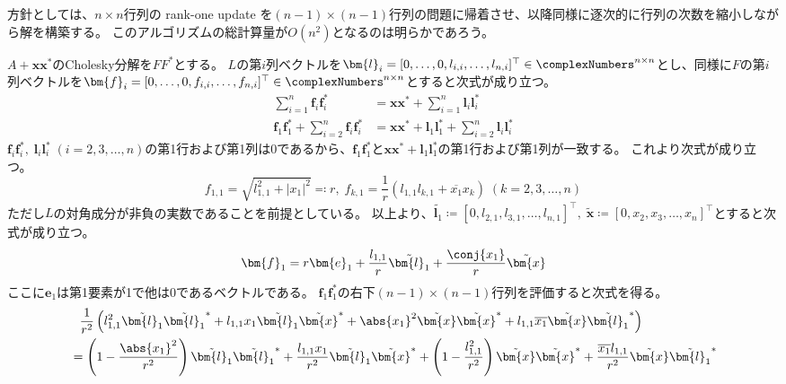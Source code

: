         \begin{derivation*}
            方針としては、$n\times n$行列の rank-one update を$(n-1)\times(n-1)$行列の問題に帰着させ、以降同様に逐次的に行列の次数を縮小しながら解を構築する。
            このアルゴリズムの総計算量が$O(n^2)$となるのは明らかであろう。
            \par
            $A+\bm{x}\bm{x}^*$のCholesky分解を$FF^*$とする。
            $L$の第$i$列ベクトルを$\bm{l}_i = [0,\dots,0,l_{i,i},\dots,l_{n,i}]^\top\in\complexNumbers^{n\times n}$とし、同様に$F$の第$i$列ベクトルを$\bm{f}_i = [0,\dots,0,f_{i,i},\dots,f_{n,i}]^\top\in\complexNumbers^{n\times n}$とすると次式が成り立つ。
            \begin{align*}
                \sum_{i=1}^n \bm{f}_i\bm{f}_i^* &= \bm{x}\bm{x}^* + \sum_{i=1}^n \bm{l}_i\bm{l}_i^* \\
                \bm{f}_1\bm{f}_1^* + \sum_{i=2}^n \bm{f}_i\bm{f}_i^* &= \bm{x}\bm{x}^* + \bm{l}_1\bm{l}_1^* + \sum_{i=2}^n \bm{l}_i\bm{l}_i^* \tag{1}
            \end{align*}
            $\bm{f}_i\bm{f}_i^*,\;\bm{l}_i\bm{l}_i^*\;(i=2,3,\dots,n)$の第1行および第1列は0であるから、$\bm{f}_1\bm{f}_1^*$と$\bm{x}\bm{x}^* + \bm{l}_1\bm{l}_1^*$の第1行および第1列が一致する。
            これより次式が成り立つ。
            \[ f_{1,1} = \sqrt{l_{1,1}^2 + |x_1|^2} \eqqcolon r,\; f_{k,1} = \frac{1}{r}\left(l_{1,1}l_{k,1} + \overline{x_1}x_k\right) \; (k=2,3,\dots,n) \tag{2} \]
            ただし$L$の対角成分が非負の実数であることを前提としている。
            以上より、$\tilde{\bm{l}_1} \coloneqq [0,l_{2,1},l_{3,1},\dots,l_{n,1}]^\top,\;\tilde{\bm{x}} \coloneqq [0,x_2,x_3,\dots,x_n]^\top$とすると次式が成り立つ。
            \[ \bm{f}_1 = r\bm{e}_1 + \frac{l_{1,1}}{r}\tilde{\bm{l}_1} + \frac{\conj{x_1}}{r}\tilde{\bm{x}} \]
            ここに$\bm{e}_1$は第1要素が1で他は0であるベクトルである。
            $\bm{f}_1\bm{f}_1^*$の右下$(n-1)\times(n-1)$行列を評価すると次式を得る。
            \begin{align*}
                &\phantom{=} \frac{1}{r^2} \left(l_{1,1}^2\tilde{\bm{l}_1}\tilde{\bm{l}_1}^* + l_{1,1}x_1\tilde{\bm{l}_1}\tilde{\bm{x}}^* + \abs{x_1}^2\tilde{\bm{x}}\tilde{\bm{x}}^* + l_{1,1}\overline{x_1}\tilde{\bm{x}}\tilde{\bm{l}_1}^*\right) \\
                &= \left(1 - \frac{\abs{x_1}^2}{r^2}\right)\tilde{\bm{l}_1}\tilde{\bm{l}_1}^* + \frac{l_{1,1}x_1}{r^2}\tilde{\bm{l}_1}\tilde{\bm{x}}^* + \left(1 - \frac{l_{1,1}^2}{r^2}\right)\tilde{\bm{x}}\tilde{\bm{x}}^* + \frac{\overline{x_1}l_{1,1}}{r^2}\tilde{\bm{x}}\tilde{\bm{l}_1}^* \\

\end{align*}
\end{derivation*}
